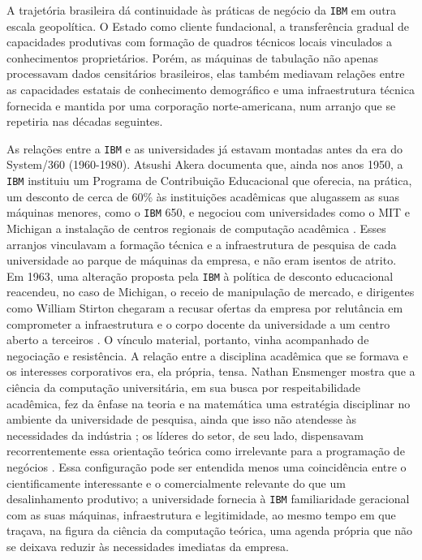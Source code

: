 A trajetória brasileira dá continuidade às práticas de negócio da \texttt{IBM} em outra escala geopolítica. O Estado como cliente fundacional, a transferência gradual de capacidades produtivas com formação de quadros técnicos locais vinculados a conhecimentos proprietários. Porém, as máquinas de tabulação não apenas processavam dados censitários brasileiros, elas também mediavam relações entre as capacidades estatais de conhecimento demográfico e uma infraestrutura técnica fornecida e mantida por uma corporação norte-americana, num arranjo que se repetiria nas décadas seguintes.

As relações entre a \texttt{IBM} e as universidades já estavam montadas antes da era do System/360 (1960-1980). Atsushi Akera documenta que, ainda nos anos 1950, a \texttt{IBM} instituiu um Programa de Contribuição Educacional que oferecia, na prática, um desconto de cerca de 60\% às instituições acadêmicas que alugassem as suas máquinas menores, como o \texttt{IBM} 650, e negociou com universidades como o MIT e Michigan a instalação de centros regionais de computação acadêmica \parencite[p.~299]{Akera2007Calculating}. Esses arranjos vinculavam a formação técnica e a infraestrutura de pesquisa de cada universidade ao parque de máquinas da empresa, e não eram isentos de atrito. Em 1963, uma alteração proposta pela \texttt{IBM} à política de desconto educacional reacendeu, no caso de Michigan, o receio de manipulação de mercado, e dirigentes como William Stirton chegaram a recusar ofertas da empresa por relutância em comprometer a infraestrutura e o corpo docente da universidade a um centro aberto a terceiros \parencite[pp.~328--329]{Akera2007Calculating}. O vínculo material, portanto, vinha acompanhado de negociação e resistência. A relação entre a disciplina acadêmica que se formava e os interesses corporativos era, ela própria, tensa. Nathan Ensmenger mostra que a ciência da computação universitária, em sua busca por respeitabilidade acadêmica, fez da ênfase na teoria e na matemática uma estratégia disciplinar no ambiente da universidade de pesquisa, ainda que isso não atendesse às necessidades da indústria \parencite[p.~20]{Ensmenger2010Computer}; os líderes do setor, de seu lado, dispensavam recorrentemente essa orientação teórica como irrelevante para a programação de negócios \parencite[p.~66]{Ensmenger2010Computer}. Essa configuração pode ser entendida menos uma coincidência entre o cientificamente interessante e o comercialmente relevante do que um desalinhamento produtivo; a universidade fornecia à \texttt{IBM} familiaridade geracional com as suas máquinas, infraestrutura e legitimidade, ao mesmo tempo em que traçava, na figura da ciência da computação teórica, uma agenda própria que não se deixava reduzir às necessidades imediatas da empresa.

